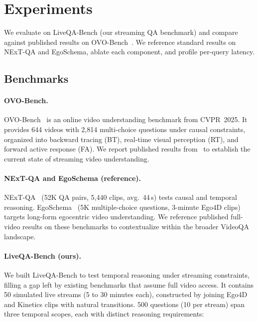 \section{Experiments}
\label{sec:experiments}

We evaluate \ours on LiveQA-Bench (our streaming QA benchmark) and compare against published results on OVO-Bench~\cite{li2025ovobench}. We reference standard results on NExT-QA and EgoSchema, ablate each component, and profile per-query latency.

\subsection{Benchmarks}
\label{sec:benchmarks}

\paragraph{OVO-Bench.}
OVO-Bench~\cite{li2025ovobench} is an online video understanding benchmark from CVPR~2025.
It provides 644 videos with 2,814 multi-choice questions under causal constraints, organized into backward tracing (BT), real-time visual perception (RT), and forward active response (FA).
We report published results from~\cite{li2025ovobench} to establish the current state of streaming video understanding.

\paragraph{NExT-QA and EgoSchema (reference).}
NExT-QA~\cite{xiao2021nextqa} (52K QA pairs, 5,440 clips, avg.\ 44\,s) tests causal and temporal reasoning.
EgoSchema~\cite{mangalam2023egoschema} (5K multiple-choice questions, 3-minute Ego4D clips) targets long-form egocentric video understanding.
We reference published full-video results on these benchmarks to contextualize \ours within the broader VideoQA landscape.

\paragraph{LiveQA-Bench (ours).}
We built LiveQA-Bench to test temporal reasoning under streaming constraints, filling a gap left by existing benchmarks that assume full video access.
It contains 50 simulated live streams (5 to 30 minutes each), constructed by joining Ego4D~\cite{grauman2022ego4d} and Kinetics clips with natural transitions.
500 questions (10 per stream) span three temporal scopes, each with distinct reasoning requirements:

